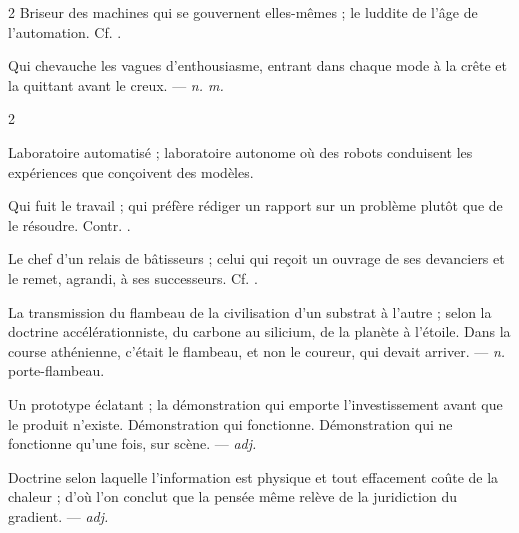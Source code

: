 \begin{multicols}{2}
 Briseur des machines qui se gouvernent elles-mêmes ; le luddite de l'âge de l'automation. Cf. .

 Qui chevauche les vagues d'enthousiasme, entrant dans chaque mode à la crête et la quittant avant le creux. —  \textit{n. m.}

\end{multicols}

\begin{multicols}{2}

 Laboratoire automatisé ; laboratoire autonome où des robots conduisent les expériences que conçoivent des modèles.  

 Qui fuit le travail ;  qui préfère rédiger un rapport sur un problème plutôt que de le résoudre. Contr. .

 Le chef d'un relais de bâtisseurs ; celui qui reçoit un ouvrage de ses devanciers et le remet, agrandi, à ses successeurs. Cf. .

 La transmission du flambeau de la civilisation d'un substrat à l'autre ; selon la doctrine accélérationniste, du carbone au silicium, de la planète à l'étoile. Dans la course athénienne, c'était le flambeau, et non le coureur, qui devait arriver. —  \textit{n.} porte-flambeau.

 Un prototype éclatant ; la démonstration qui emporte l'investissement avant que le produit n'existe.  Démonstration qui fonctionne.   Démonstration qui ne fonctionne qu'une fois, sur scène. —  \textit{adj.}

 Doctrine selon laquelle l'information est physique et tout effacement coûte de la chaleur ; d'où l'on conclut que la pensée même relève de la juridiction du gradient. —  \textit{adj.}


\end{multicols}
